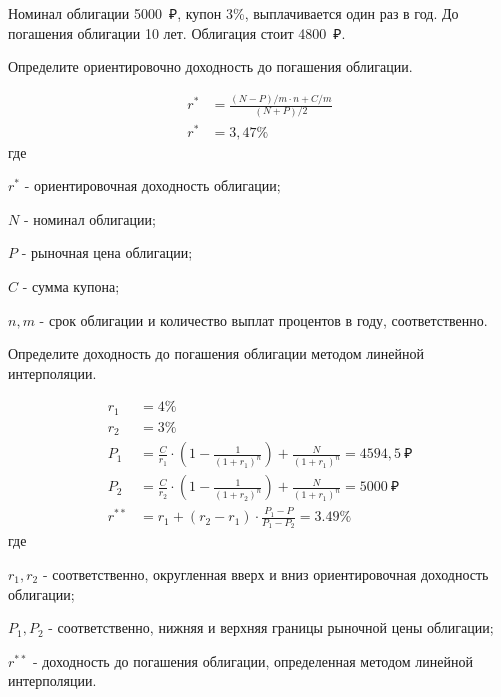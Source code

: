 \documentclass[12pt, table]{exam}
\begin{document}
\begin{questions}
\begin{subparts}
\begin{solution}[12em]
	\end{solution}
\end{subparts}
\addpoints

\pagebreak
\question[20] Номинал облигации 5000~₽, купон 3\%, выплачивается один раз в год. До погашения облигации 10 лет. Облигация стоит 4800~₽. 
\noaddpoints
\begin{subparts}
	\subpart[10] Определите ориентировочно доходность до погашения облигации.
	\begin{solution}[12em]
		\begin{align*}
		r^*&=\frac{(N-P)/m \cdot n + C/m }{(N+P)/2}\\
		r^*&=3,47\%
		\end{align*}
		где
		
		$r^*$ - ориентировочная доходность облигации;
		
		$N$ - номинал облигации;
		
		$P$ - рыночная цена облигации;
		
		$C$ - сумма купона;
		
		$n, m$ - срок облигации и количество выплат процентов в году, соответственно.
	\end{solution}
	
	\subpart[10] Определите доходность до погашения облигации методом линейной интерполяции.
	
	\begin{solution}[12em]
		\begin{align*}
		r_1&=4\%\\
		r_2&=3\%\\
		P_1&=\frac{C}{r_1} \cdot \left(1 - \frac{1}{(1+r_1)^n} \right) + \frac{N}{(1+r_1)^n}=4594,5~₽\\
		P_2&=\frac{C}{r_2} \cdot \left(1 - \frac{1}{(1+r_2)^n} \right) + \frac{N}{(1+r_1)^n}=5000~₽\\
		r^{**}&=r_1+(r_2-r_1) \cdot \frac{P_1-P}{P_1-P_2}=3.49\%
		\end{align*}	
		где
		
		$r_1, r_2$ - соответственно, округленная вверх и вниз ориентировочная доходность облигации;
		
		$P_1, P_2$ - соответственно, нижняя и верхняя границы рыночной цены облигации;
		
		$r^{**}$ - доходность до погашения облигации, определенная методом линейной интерполяции.
	\end{solution}
	
\end{subparts}
\addpoints


\end{questions}
\end{document}
